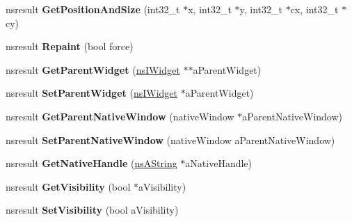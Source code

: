 \begin{DoxyCompactItemize}
nsresult {\bfseries Get\+Position\+And\+Size} (int32\+\_\+t $\ast$x, int32\+\_\+t $\ast$y, int32\+\_\+t $\ast$cx, int32\+\_\+t $\ast$cy)
\item 
\mbox{\label{interfacens_i_base_window_aeac4f72c42fae1739b24debd2a7b7435}} 
nsresult {\bfseries Repaint} (bool force)
\item 
\mbox{\label{interfacens_i_base_window_afde1b96380cc3cdedcfd0a846eeceb05}} 
nsresult {\bfseries Get\+Parent\+Widget} (\hyperlink{interfacens_i_supports}{ns\+I\+Widget} $\ast$$\ast$a\+Parent\+Widget)
\item 
\mbox{\label{interfacens_i_base_window_ad42396a7da58cdfcaab072f0a14bcbfa}} 
nsresult {\bfseries Set\+Parent\+Widget} (\hyperlink{interfacens_i_supports}{ns\+I\+Widget} $\ast$a\+Parent\+Widget)
\item 
\mbox{\label{interfacens_i_base_window_a1bb591721d34cbdd6822fd8f559c98b0}} 
nsresult {\bfseries Get\+Parent\+Native\+Window} (native\+Window $\ast$a\+Parent\+Native\+Window)
\item 
\mbox{\label{interfacens_i_base_window_ac0a57f93381af35bfc6bd271b2da8ca5}} 
nsresult {\bfseries Set\+Parent\+Native\+Window} (native\+Window a\+Parent\+Native\+Window)
\item 
\mbox{\label{interfacens_i_base_window_abc4feaae6744e3548b753e44805e0ab0}} 
nsresult {\bfseries Get\+Native\+Handle} (\hyperlink{structns_string_container}{ns\+A\+String} $\ast$a\+Native\+Handle)
\item 
\mbox{\label{interfacens_i_base_window_a9f3600d735e44f892c9578a9f5efd2b5}} 
nsresult {\bfseries Get\+Visibility} (bool $\ast$a\+Visibility)
\item 
\mbox{\label{interfacens_i_base_window_a44cb759a90270b1d543b80c3cef12236}} 
nsresult {\bfseries Set\+Visibility} (bool a\+Visibility)
\item 
\mbox{\label{interfacens_i_base_window_a8fa98c13ae5ee275645e8afddb76ac72}} 
$$
\end{DoxyCompactItemize}

